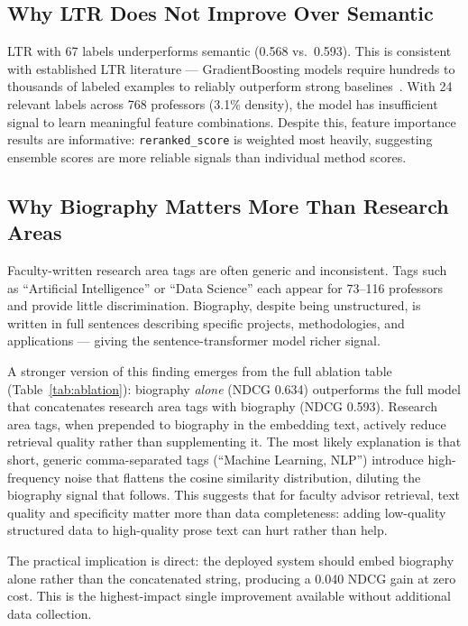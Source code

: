\documentclass[11pt,a4paper]{article}
\begin{document}
\subsection{Why LTR Does Not Improve Over Semantic}

LTR with 67 labels underperforms semantic (0.568 vs.\ 0.593). This is
consistent with established LTR literature --- GradientBoosting models require
hundreds to thousands of labeled examples to reliably outperform strong
baselines~\cite{liu2009learning}. With 24 relevant labels across 768 professors
(3.1\% density), the model has insufficient signal to learn meaningful feature
combinations. Despite this, feature importance results are informative:
\texttt{reranked\_score} is weighted most heavily, suggesting ensemble scores
are more reliable signals than individual method scores.

\subsection{Why Biography Matters More Than Research Areas}

Faculty-written research area tags are often generic and inconsistent. Tags
such as ``Artificial Intelligence'' or ``Data Science'' each appear for
73--116 professors and provide little discrimination. Biography, despite being
unstructured, is written in full sentences describing specific projects,
methodologies, and applications --- giving the sentence-transformer model
richer signal.

A stronger version of this finding emerges from the full ablation table
(Table~\ref{tab:ablation}): biography \emph{alone} (NDCG 0.634) outperforms
the full model that concatenates research area tags with biography (NDCG
0.593). Research area tags, when prepended to biography in the embedding
text, actively reduce retrieval quality rather than supplementing it.
The most likely explanation is that short, generic comma-separated tags
(``Machine Learning, NLP'') introduce high-frequency noise that flattens
the cosine similarity distribution, diluting the biography signal that follows.
This suggests that for faculty advisor retrieval, text quality and specificity
matter more than data completeness: adding low-quality structured data to
high-quality prose text can hurt rather than help.

The practical implication is direct: the deployed system should embed
biography alone rather than the concatenated string, producing a 0.040
NDCG gain at zero cost. This is the highest-impact single improvement
available without additional data collection.
\end{document}
